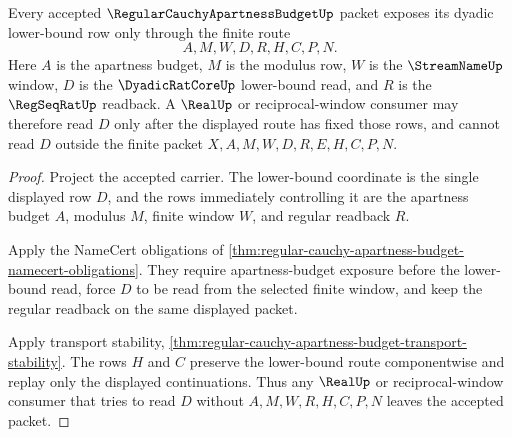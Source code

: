 \begin{theorem}
\label{thm:regular-cauchy-apartness-budget-lower-bound-scope}
Every accepted $\RegularCauchyApartnessBudgetUp$ packet exposes its dyadic lower-bound row only through the finite route
$$
A,M,W,D,R,H,C,P,N .
$$
Here $A$ is the apartness budget, $M$ is the modulus row, $W$ is the $\StreamNameUp$ window, $D$ is the $\DyadicRatCoreUp$ lower-bound read, and $R$ is the $\RegSeqRatUp$ readback. A $\RealUp$ or reciprocal-window consumer may therefore read $D$ only after the displayed route has fixed those rows, and cannot read $D$ outside the finite packet $X,A,M,W,D,R,E,H,C,P,N$.
\end{theorem}
\begin{proof}
Project the accepted carrier. The lower-bound coordinate is the single displayed row $D$, and the rows immediately controlling it are the apartness budget $A$, modulus $M$, finite window $W$, and regular readback $R$.

Apply the NameCert obligations of \autoref{thm:regular-cauchy-apartness-budget-namecert-obligations}. They require apartness-budget exposure before the lower-bound read, force $D$ to be read from the selected finite window, and keep the regular readback on the same displayed packet.

Apply transport stability, \autoref{thm:regular-cauchy-apartness-budget-transport-stability}. The rows $H$ and $C$ preserve the lower-bound route componentwise and replay only the displayed continuations. Thus any $\RealUp$ or reciprocal-window consumer that tries to read $D$ without $A,M,W,R,H,C,P,N$ leaves the accepted packet.
\end{proof}

